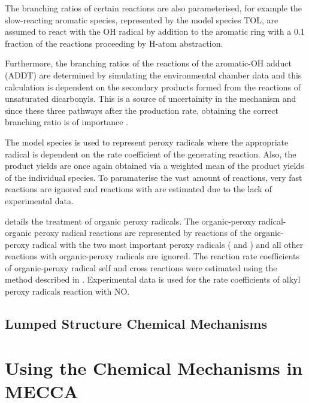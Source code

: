 The branching ratios of certain reactions are also parameterised, for example the slow-reacting aromatic species, represented by the model species TOL, are assumed to react with the OH radical by addition to the aromatic ring with a 0.1 fraction of the reactions proceeding by H-atom abstraction.
\begin{reactionlist}
\end{reactionlist}
Furthermore, the branching ratios of the reactions of the aromatic-OH adduct (ADDT) are determined by simulating the environmental chamber data and this calculation is dependent on the secondary products formed from the reactions of unsaturated dicarbonyls. 
This is a source of uncertainity in the mechanism and since these three pathways after the  production rate, obtaining the correct branching ratio is of importance \citep{Stockwell:1997}.

The model species  is used to represent peroxy radicals where the appropriate  radical is dependent on the rate coefficient of the generating reaction. 
Also, the product yields are once again obtained via a weighted mean of the product yields of the individual species. 
To paramaterise the vast amount of reactions, very fast reactions are ignored and reactions with  are estimated due to the lack of experimental data. 

\citep{Kirchner:1996} details the treatment of organic peroxy radicals. 
The organic-peroxy radical-organic peroxy radical reactions are represented by reactions of the organic-peroxy radical with the two most important peroxy radicals ( and ) and all other reactions with organic-peroxy radicals are ignored. 
The reaction rate coefficients of organic-peroxy radical self and cross reactions were estimated using the method described in \citep{Kirchner:1996}. 
Experimental data is used for the rate coefficients of alkyl peroxy radicals reaction with NO. 

\subsection{Lumped Structure Chemical Mechanisms} \label{ss:lumped_structure}

\section{Using the Chemical Mechanisms in MECCA}
